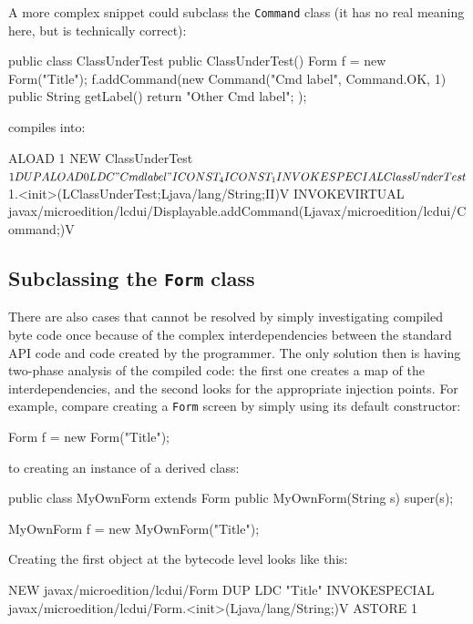 A more complex snippet could subclass the \texttt{Command} class (it has no real meaning here, but is
technically correct):

\begin{javablock}
public class ClassUnderTest {
    public ClassUnderTest() {
        Form f = new Form("Title");
        f.addCommand(new Command("Cmd label", Command.OK, 1) {
            public String getLabel() {
                return "Other Cmd label";
            }
        });
    }
}
\end{javablock}

\noindent%
compiles into:

\begin{javablock}
ALOAD 1
NEW ClassUnderTest$1
DUP
ALOAD 0
LDC "Cmd label"
ICONST_4
ICONST_1
INVOKESPECIAL ClassUnderTest$1.<init>(LClassUnderTest;Ljava/lang/String;II)V
INVOKEVIRTUAL javax/microedition/lcdui/Displayable.addCommand(Ljavax/microedition/lcdui/Command;)V
\end{javablock}


\subsection{Subclassing the \texttt{Form} class}

There are also cases that cannot be resolved by simply investigating compiled byte code once because of the complex
interdependencies between the standard API code and code created by the programmer. The only solution then is
having two-phase analysis of the compiled code: the first one creates a map of the interdependencies, and the second
looks for the appropriate injection points. For example, compare creating a \texttt{Form} screen by simply using 
its default constructor:

\begin{javablock}
Form f = new Form("Title");
\end{javablock}

\noindent%
to creating an instance of a derived class: 

\begin{javablock}
public class MyOwnForm extends Form {	
    public MyOwnForm(String s) {
        super(s);
    }
}

MyOwnForm f = new MyOwnForm("Title");
\end{javablock}

\noindent%
Creating the first object at the bytecode level looks like this:

\begin{javablock}
NEW javax/microedition/lcdui/Form
DUP
LDC "Title"
INVOKESPECIAL javax/microedition/lcdui/Form.<init>(Ljava/lang/String;)V
ASTORE 1
\end{javablock}

